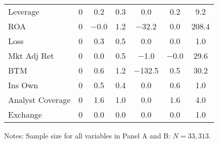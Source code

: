 \documentclass[12pt,english]{article}
\begin{document}
\begin{table}[ht]
\begin{threeparttable}
\begin{tabular}{lcccccc}
Leverage & 0 & \num{0.2} & \num{0.3} & \num{0.0} & \num{0.2} & \num{9.2}\\
ROA & 0 & \num{-0.0} & \num{1.2} & \num{-32.2} & \num{0.0} & \num{208.4}\\
Loss & 0 & \num{0.3} & \num{0.5} & \num{0.0} & \num{0.0} & \num{1.0}\\
Mkt Adj Ret & 0 & \num{0.0} & \num{0.5} & \num{-1.0} & \num{-0.0} & \num{29.6}\\
BTM & 0 & \num{0.6} & \num{1.2} & \num{-132.5} & \num{0.5} & \num{30.2}\\
Ins Own & 0 & \num{0.5} & \num{0.4} & \num{0.0} & \num{0.6} & \num{1.0}\\
Analyst Coverage & 0 & \num{1.6} & \num{1.0} & \num{0.0} & \num{1.6} & \num{4.0}\\
Exchange & 0 & \num{0.0} & \num{0.0} & \num{0.0} & \num{0.0} & \num{1.0}\\
\bottomrule
\end{tabular}
\footnotesize Notes: Sample size for all variables in Panel A and B: $N=33,313$.
\end{threeparttable}
\end{table}
\end{document}
